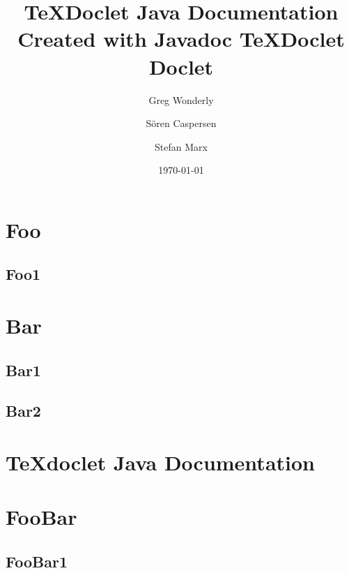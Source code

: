 \documentclass[11pt,a4paper]{report}
\begin{document}
\date{\today}
\title{TeXDoclet Java Documentation\bigskip\\ \Large Created with Javadoc TeXDoclet Doclet}
\author{Greg Wonderly \and S\"oren Caspersen \and Stefan Marx}
\maketitle

\tableofcontents

\chapter{Foo} {\section{Foo1} {\blindtext}}

\chapter{Bar} {\section{Bar1} {\blindtext \newline \newline \blindtext }\section{Bar2} {\blindtext}}

\chapter{TeXdoclet Java Documentation} {

}

\chapter{FooBar} {\section{FooBar1} {\blindtext}}
\end{document}
